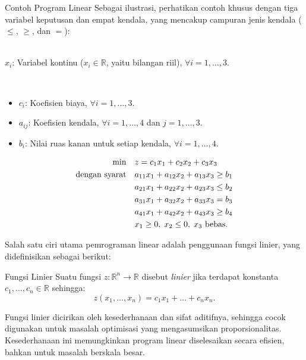 \begin{example}{Contoh Program Linear}{}
Sebagai ilustrasi, perhatikan contoh khusus dengan tiga variabel keputusan dan empat kendala, yang mencakup campuran jenis kendala ($\leq$, $\geq$, dan $=$):

\smallskip {}\\
$x_i$: Variabel kontinu ($x_i \in \mathbb{R}$, yaitu bilangan riil), $\forall i = 1,\dots,3$.

\smallskip {}\\
\begin{itemize}
    \item $c_i$: Koefisien biaya, $\forall i = 1,\dots,3$.
    \item $a_{ij}$: Koefisien kendala, $\forall i = 1,\dots,4$ dan $j = 1,\dots,3$.
    \item $b_i$: Nilai ruas kanan untuk setiap kendala, $\forall i = 1,\dots,4$.
\end{itemize}

\smallskip {}
\begin{align*}
\min \quad & z = c_1x_1 + c_2x_2 + c_3x_3 \\
\mbox{dengan syarat}\quad        & a_{11}x_1 + a_{12}x_2 + a_{13}x_3 \geq b_1 \\
& a_{21}x_1 + a_{22}x_2 + a_{23}x_3 \leq b_2 \\
& a_{31}x_1 + a_{32}x_2 + a_{33}x_3 = b_3 \\
& a_{41}x_1 + a_{42}x_2 + a_{43}x_3 \geq b_4 \\
& x_1 \geq 0, \; x_2 \leq 0, \; x_3 \mbox{ bebas.}
\end{align*}
\end{example}

Salah satu ciri utama pemrograman linear adalah penggunaan fungsi linier, yang didefinisikan sebagai berikut:

\begin{definition}{Fungsi Linier}\label{def:linearfunction}
Suatu fungsi $z: \mathbb{R}^n \rightarrow \mathbb{R}$ disebut \textit{linier} jika terdapat konstanta $c_1, \dots, c_n \in \mathbb{R}$ sehingga:
\begin{equation}
z(x_1, \dots, x_n) = c_1x_1 + \dots + c_nx_n.
\end{equation}
\label{def:LinearFunc}
\end{definition}

Fungsi linier dicirikan oleh kesederhanaan dan sifat aditifnya, sehingga cocok digunakan untuk masalah optimisasi yang mengasumsikan proporsionalitas. Kesederhanaan ini memungkinkan program linear diselesaikan secara efisien, bahkan untuk masalah berskala besar.

